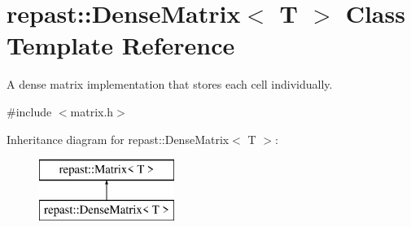 \hypertarget{classrepast_1_1_dense_matrix}{\section{repast\-:\-:Dense\-Matrix$<$ T $>$ Class Template Reference}
\label{classrepast_1_1_dense_matrix}
}


A dense matrix implementation that stores each cell individually.  




{\ttfamily \#include $<$matrix.\-h$>$}

Inheritance diagram for repast\-:\-:Dense\-Matrix$<$ T $>$\-:\begin{figure}[H]
\begin{center}
\leavevmode
\includegraphics[height=2.000000cm]{classrepast_1_1_dense_matrix}
\end{center}
\end{figure}
